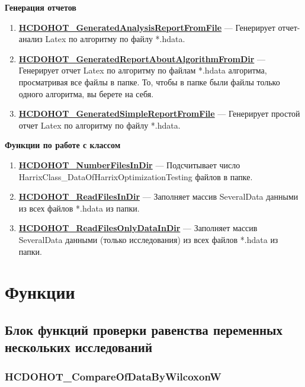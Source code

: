\documentclass[a4paper,12pt]{article}
\begin{document}
\textbf{Генерация отчетов}
\begin{enumerate}
	
	\item \textbf{\hyperref[HCDOHOT_GeneratedAnalysisReportFromFile]{HCDOHOT\_GeneratedAnalysisReportFromFile}} --- Генерирует отчет-анализ Latex по алгоритму по файлу *.hdata.
	
	\item \textbf{\hyperref[HCDOHOT_GeneratedReportAboutAlgorithmFromDir]{HCDOHOT\_GeneratedReportAboutAlgorithmFromDir}} --- Генерирует отчет Latex по алгоритму по файлам *.hdata алгоритма, просматривая все файлы в папке. То, чтобы в папке были файлы только одного алгоритма, вы берете на себя.
	
	\item \textbf{\hyperref[HCDOHOT_GeneratedSimpleReportFromFile]{HCDOHOT\_GeneratedSimpleReportFromFile}} --- Генерирует простой отчет Latex по алгоритму по файлу *.hdata.
	
\end{enumerate}

\textbf{Функции по работе с классом}
\begin{enumerate}
	
	\item \textbf{\hyperref[HCDOHOT_NumberFilesInDir]{HCDOHOT\_NumberFilesInDir}} --- Подсчитывает число HarrixClass\_DataOfHarrixOptimizationTesting файлов в папке.
	
	\item \textbf{\hyperref[HCDOHOT_ReadFilesInDir]{HCDOHOT\_ReadFilesInDir}} --- Заполняет массив SeveralData данными из всех файлов *.hdata из папки.
	
	\item \textbf{\hyperref[HCDOHOT_ReadFilesOnlyDataInDir]{HCDOHOT\_ReadFilesOnlyDataInDir}} --- Заполняет массив SeveralData данными (только исследования) из всех файлов *.hdata из папки.
	
\end{enumerate}


\newpage
\section{Функции}
\subsection{Блок функций проверки равенства переменных нескольких исследований}

\subsubsection{HCDOHOT\_CompareOfDataByWilcoxonW}\label{HCDOHOT_CompareOfDataByWilcoxonW}
\end{document}
